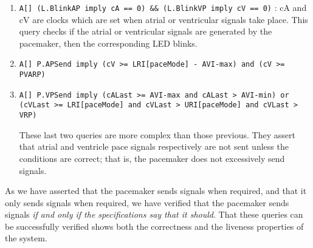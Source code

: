\documentclass[a4paper]{article}
\begin{document}
\begin{enumerate}
\item {\tt A[] (L.BlinkAP imply cA == 0) \&\& (L.BlinkVP imply cV == 0)} : cA and cV are clocks which are set when atrial or ventricular signals take place. This query checks if the atrial or ventricular signals are generated by the pacemaker, then the corresponding  LED blinks. 

\item {\tt A[] P.APSend imply (cV >= LRI[paceMode] - AVI-max) and (cV >= PVARP)}

\item {\tt A[] P.VPSend imply (cALast >= AVI-max and cALast > AVI-min) or (cVLast >= LRI[paceMode] and cVLast > URI[paceMode] and cVLast > VRP)}

These last two queries are more complex than those previous.  They assert that atrial and ventricle pace signals respectively are not sent unless the conditions are correct; that is, the pacemaker does not excessively send signals.
\end{enumerate}

As we have asserted that the pacemaker sends signals when required, and that it only sends signals when required, we have verified that the pacemaker sends signals {\it if and only if the specifications say that it should}.  That these queries can be successfully verified shows both the correctness and the liveness properties of the system.
\end{document}
